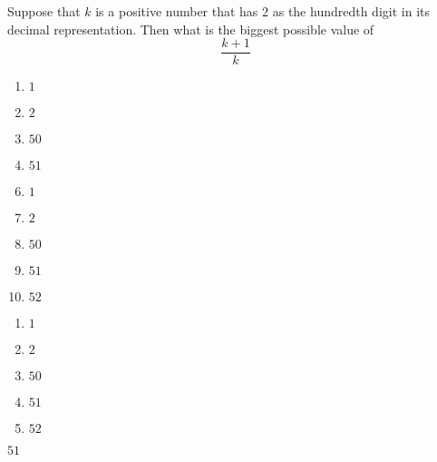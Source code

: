 





  Suppose that $k$ is a positive number that has 2 as the hundredth digit in its decimal representation.  Then what is the biggest possible value of 
\[\frac{k+1}{k}\]



\ifsat
	\begin{enumerate}[label=\Alph*)]
		\item    $1$
		\item  $2$
		\item $50$
		\item $51$ %
	\end{enumerate}
\else
\fi

\ifacteven
	\begin{enumerate}[label=\textbf{\Alph*.},itemsep=\fill,align=left]
		\setcounter{enumii}{5}
		\item    $1$
		\item  $2$
		\item $50$
		\addtocounter{enumii}{1}
		\item $51$ %
		\item $52$ 
	\end{enumerate}
\else
\fi

\ifactodd
	\begin{enumerate}[label=\textbf{\Alph*.},itemsep=\fill,align=left]
		\item    $1$
		\item  $2$
		\item $50$
		\item $51$ %
		\item $52$ 
	\end{enumerate}
\else
\fi

\ifgridin
 $51$ %

\else
\fi


